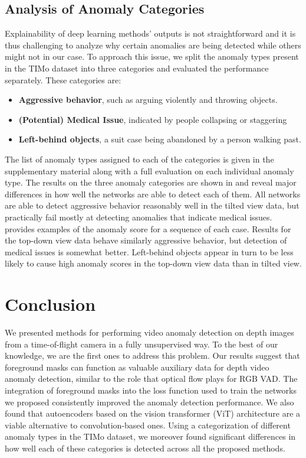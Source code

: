 \documentclass[10pt,twocolumn,letterpaper]{article}
\begin{document}
\subsection{Analysis of Anomaly Categories} \label{sec:anom_cats}
Explainability of deep learning methods' outputs is not straightforward and it is thus challenging to analyze why certain anomalies are being detected while others might not in our case. To approach this issue, we split the anomaly types present in the TIMo dataset into three categories and evaluated the performance separately. These categories are:
\begin{itemize}
    \item \textbf{Aggressive behavior}, such as arguing violently and throwing objects.
    \item \textbf{(Potential) Medical Issue}, indicated by people collapsing or staggering \etc
    \item \textbf{Left-behind objects}, \eg a suit case being abandoned by a person walking past.
\end{itemize}

The list of anomaly types assigned to each of the categories is given in the supplementary material along with a full evaluation on each individual anomaly type. The results on the three anomaly categories are shown in  and reveal major differences in how well the networks are able to detect each of them. All networks are able to detect aggressive behavior reasonably well in the tilted view data, but practically fail mostly at detecting anomalies that indicate medical issues.  provides examples of the anomaly score for a sequence of each case. Results for the top-down view data behave similarly \wrt aggressive behavior, but detection of medical issues is somewhat better. Left-behind objects appear in turn to be less likely to cause high anomaly scores in the top-down view data than in tilted view.

\section{Conclusion} \label{sec:conc}
We presented methods for performing video anomaly detection on depth images from a time-of-flight camera in a fully unsupervised way. To the best of our knowledge, we are the first ones to address this problem. Our results suggest that foreground masks can function as valuable auxiliary data for depth video anomaly detection, similar to the role that optical flow plays for RGB VAD. The integration of foreground masks into the loss function used to train the networks we proposed consistently improved the anomaly detection performance. We also found that autoencoders based on the vision transformer (ViT) architecture are a viable alternative to convolution-based ones. Using a categorization of different anomaly types in the TIMo dataset, we moreover found significant differences in how well each of these categories is detected across all the proposed methods.
\end{document}
